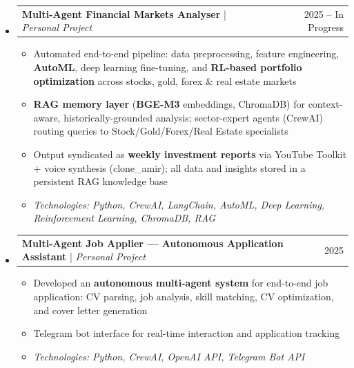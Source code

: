 \documentclass[11pt,a4paper]{article}
\makeatletter
\newcommand{\subspace}{\vspace{0.5em}}
\newcommand{\headerrow}[2]{
    \begin{tabular*}{\linewidth}{l@{\extracolsep{\fill}}r}
    #1 & \textcolor{primary}{#2} \\
    \end{tabular*}
}
\makeatother
\begin{document}
\begin{itemize}[leftmargin=1em, label={}]
    \subspace 
    \item
    \headerrow{\textbf{Multi-Agent Financial Markets Analyser} | \emph{Personal Project}}{2025 -- In Progress}
    \begin{itemize}[leftmargin=1.5em, label=$\bullet$, nosep]
        \item Automated end-to-end pipeline: data preprocessing, feature engineering, \textbf{AutoML}, deep learning fine-tuning, and \textbf{RL-based portfolio optimization} across stocks, gold, forex \& real estate markets
        \item \textbf{RAG memory layer} (\textbf{BGE-M3} embeddings, ChromaDB) for context-aware, historically-grounded analysis; sector-expert agents (CrewAI) routing queries to Stock/Gold/Forex/Real Estate specialists
        \item Output syndicated as \textbf{weekly investment reports} via YouTube Toolkit + voice synthesis (clone\_amir); all data and insights stored in a persistent RAG knowledge base
        \item \emph{Technologies: Python, CrewAI, LangChain, AutoML, Deep Learning, Reinforcement Learning, ChromaDB, RAG}
    \end{itemize}

    \subspace 
    \item
    \headerrow{\textbf{Multi-Agent Job Applier — Autonomous Application Assistant} | \emph{Personal Project}}{2025}
    \begin{itemize}[leftmargin=1.5em, label=$\bullet$, nosep]
        \item Developed an \textbf{autonomous multi-agent system} for end-to-end job application: CV parsing, job analysis, skill matching, CV optimization, and cover letter generation
        \item Telegram bot interface for real-time interaction and application tracking
        \item \emph{Technologies: Python, CrewAI, OpenAI API, Telegram Bot API}
    \end{itemize}
\end{itemize}
\end{document}
